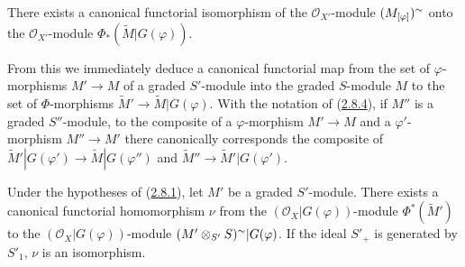 \begin{proposition}[2.8.7]
\label{II.2.8.7}
There exists a canonical functorial isomorphism of the
$\mathcal{O}_{X'}$-module $(M_{[\varphi]})^{\sim}$ onto the
$\mathcal{O}_{X'}$-module $\Phi_*(\widetilde{M}|G(\varphi))$.
\end{proposition}

From this we immediately deduce a canonical functorial map from the set of
$\varphi$-morphisms $M'\to M$ of a graded $S'$-module into the graded
$S$-module $M$ to the set of $\Phi$-morphisms
$\widetilde{M}'\to\widetilde{M}|G(\varphi)$. With the notation of
(\hyperref[II.2.8.4]{2.8.4}), if $M''$ is a graded $S''$-module, to the
composite of a $\varphi$-morphism $M'\to M$ and a $\varphi'$-morphism
$M''\to M'$ there canonically corresponds the composite of
$\widetilde{M}'|G(\varphi')\to\widetilde{M}|G(\varphi'')$ and
$\widetilde{M}''\to\widetilde{M}'|G(\varphi')$.

\begin{proposition}[2.8.8]
\label{II.2.8.8}
Under the hypotheses of \textup{(\hyperref[II.2.8.1]{2.8.1})}, let $M'$ be a graded
$S'$-module. There exists a canonical functorial homomorphism $\nu$ from the
$(\mathcal{O}_X|G(\varphi))$-module $\Phi^*(\widetilde{M}')$ to the
$(\mathcal{O}_X|G(\varphi))$-module
$(M'\otimes_{S'}S)^{\sim}|G(\varphi)$. If the ideal $S'_+$
is generated by $S'_1$, $\nu$ is an isomorphism.
\end{proposition}

